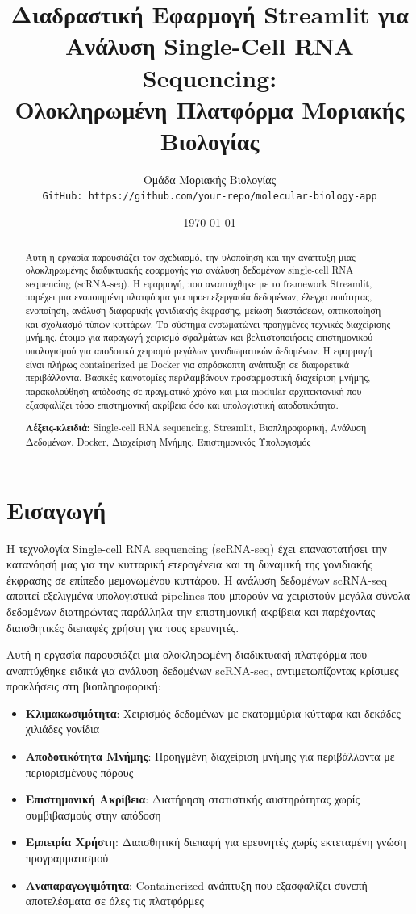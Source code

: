 \documentclass[11pt,a4paper]{article}
\title{\textbf{Διαδραστική Εφαρμογή Streamlit για\\Ανάλυση Single-Cell RNA Sequencing:\\Ολοκληρωμένη Πλατφόρμα Μοριακής Βιολογίας}}
\author{
    Ομάδα Μοριακής Βιολογίας\\
    \texttt{GitHub: https://github.com/your-repo/molecular-biology-app}
}
\date{\today}
\begin{document}
\maketitle

\begin{abstract}
Αυτή η εργασία παρουσιάζει τον σχεδιασμό, την υλοποίηση και την ανάπτυξη μιας ολοκληρωμένης διαδικτυακής εφαρμογής για ανάλυση δεδομένων single-cell RNA sequencing (scRNA-seq). Η εφαρμογή, που αναπτύχθηκε με το framework Streamlit, παρέχει μια ενοποιημένη πλατφόρμα για προεπεξεργασία δεδομένων, έλεγχο ποιότητας, ενοποίηση, ανάλυση διαφορικής γονιδιακής έκφρασης, μείωση διαστάσεων, οπτικοποίηση και σχολιασμό τύπων κυττάρων. Το σύστημα ενσωματώνει προηγμένες τεχνικές διαχείρισης μνήμης, έτοιμο για παραγωγή χειρισμό σφαλμάτων και βελτιστοποιήσεις επιστημονικού υπολογισμού για αποδοτικό χειρισμό μεγάλων γονιδιωματικών δεδομένων. Η εφαρμογή είναι πλήρως containerized με Docker για απρόσκοπτη ανάπτυξη σε διαφορετικά περιβάλλοντα. Βασικές καινοτομίες περιλαμβάνουν προσαρμοστική διαχείριση μνήμης, παρακολούθηση απόδοσης σε πραγματικό χρόνο και μια modular αρχιτεκτονική που εξασφαλίζει τόσο επιστημονική ακρίβεια όσο και υπολογιστική αποδοτικότητα.

\textbf{Λέξεις-κλειδιά:} Single-cell RNA sequencing, Streamlit, Βιοπληροφορική, Ανάλυση Δεδομένων, Docker, Διαχείριση Μνήμης, Επιστημονικός Υπολογισμός
\end{abstract}

\section{Εισαγωγή}

Η τεχνολογία Single-cell RNA sequencing (scRNA-seq) έχει επαναστατήσει την κατανόησή μας για την κυτταρική ετερογένεια και τη δυναμική της γονιδιακής έκφρασης σε επίπεδο μεμονωμένου κυττάρου. Η ανάλυση δεδομένων scRNA-seq απαιτεί εξελιγμένα υπολογιστικά pipelines που μπορούν να χειριστούν μεγάλα σύνολα δεδομένων διατηρώντας παράλληλα την επιστημονική ακρίβεια και παρέχοντας διαισθητικές διεπαφές χρήστη για τους ερευνητές.

Αυτή η εργασία παρουσιάζει μια ολοκληρωμένη διαδικτυακή πλατφόρμα που αναπτύχθηκε ειδικά για ανάλυση δεδομένων scRNA-seq, αντιμετωπίζοντας κρίσιμες προκλήσεις στη βιοπληροφορική:

\begin{itemize}
    \item \textbf{Κλιμακωσιμότητα}: Χειρισμός δεδομένων με εκατομμύρια κύτταρα και δεκάδες χιλιάδες γονίδια
    \item \textbf{Αποδοτικότητα Μνήμης}: Προηγμένη διαχείριση μνήμης για περιβάλλοντα με περιορισμένους πόρους
    \item \textbf{Επιστημονική Ακρίβεια}: Διατήρηση στατιστικής αυστηρότητας χωρίς συμβιβασμούς στην απόδοση
    \item \textbf{Εμπειρία Χρήστη}: Διαισθητική διεπαφή για ερευνητές χωρίς εκτεταμένη γνώση προγραμματισμού
    \item \textbf{Αναπαραγωγιμότητα}: Containerized ανάπτυξη που εξασφαλίζει συνεπή αποτελέσματα σε όλες τις πλατφόρμες
\end{itemize}
\end{document}
